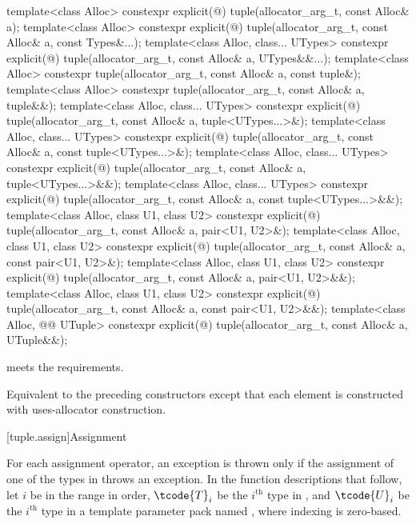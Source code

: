 %
\begin{itemdecl}
template<class Alloc>
  constexpr explicit(@\seebelow@)
    tuple(allocator_arg_t, const Alloc& a);
template<class Alloc>
  constexpr explicit(@\seebelow@)
    tuple(allocator_arg_t, const Alloc& a, const Types&...);
template<class Alloc, class... UTypes>
  constexpr explicit(@\seebelow@)
    tuple(allocator_arg_t, const Alloc& a, UTypes&&...);
template<class Alloc>
  constexpr tuple(allocator_arg_t, const Alloc& a, const tuple&);
template<class Alloc>
  constexpr tuple(allocator_arg_t, const Alloc& a, tuple&&);
template<class Alloc, class... UTypes>
  constexpr explicit(@\seebelow@)
    tuple(allocator_arg_t, const Alloc& a, tuple<UTypes...>&);
template<class Alloc, class... UTypes>
  constexpr explicit(@\seebelow@)
    tuple(allocator_arg_t, const Alloc& a, const tuple<UTypes...>&);
template<class Alloc, class... UTypes>
  constexpr explicit(@\seebelow@)
    tuple(allocator_arg_t, const Alloc& a, tuple<UTypes...>&&);
template<class Alloc, class... UTypes>
  constexpr explicit(@\seebelow@)
    tuple(allocator_arg_t, const Alloc& a, const tuple<UTypes...>&&);
template<class Alloc, class U1, class U2>
  constexpr explicit(@\seebelow@)
    tuple(allocator_arg_t, const Alloc& a, pair<U1, U2>&);
template<class Alloc, class U1, class U2>
  constexpr explicit(@\seebelow@)
    tuple(allocator_arg_t, const Alloc& a, const pair<U1, U2>&);
template<class Alloc, class U1, class U2>
  constexpr explicit(@\seebelow@)
    tuple(allocator_arg_t, const Alloc& a, pair<U1, U2>&&);
template<class Alloc, class U1, class U2>
  constexpr explicit(@\seebelow@)
    tuple(allocator_arg_t, const Alloc& a, const pair<U1, U2>&&);
template<class Alloc, @@ UTuple>
  constexpr explicit(@\seebelow@)
    tuple(allocator_arg_t, const Alloc& a, UTuple&&);
\end{itemdecl}

\begin{itemdescr}
\pnum
\expects
{} meets
the  requirements.

\pnum
\effects
Equivalent to the preceding constructors except that each element is constructed with
uses-allocator construction.
\end{itemdescr}

[tuple.assign]{Assignment}

\pnum
For each  assignment operator, an exception is thrown only if the
assignment of one of the types in  throws an exception.
In the function descriptions that follow, let $i$ be in the range 
in order, $\tcode{T}_i$ be the $i^\text{th}$ type in ,
and $\tcode{U}_i$ be the $i^\text{th}$ type in a
template parameter pack named , where indexing is zero-based.

